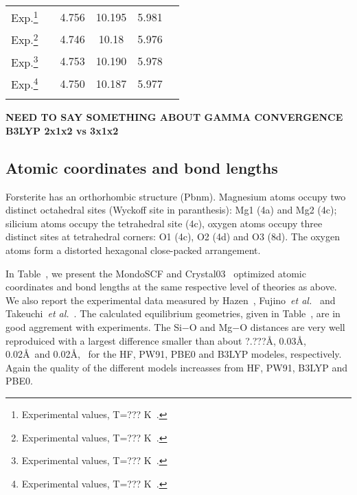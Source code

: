 \documentclass[pra,twocolumn,twocolumngrid,superbib]{revtex4} %
\begin{document}
\begin{table}[t]
\begin{tabular}{llcccc}
    {Exp.}\footnote[7]{Experimental values, T=??? K~\cite{HYoder57}.}
    &        & 4.756 & 10.195 & 5.981 & \\
    {Exp.}\footnote[8]{Experimental values, T=??? K~\cite{RHazen76}.}
    &        & 4.746 & 10.18  & 5.976 & \\
    {Exp.}\footnote[9]{Experimental values, T=??? K~\cite{KFujino81}.}
    &        & 4.753 & 10.190 & 5.978 & \\
    {Exp.}\footnote[10]{Experimental values, T=??? K~\cite{YTakeuchi84}.}
    &        & 4.750 & 10.187 & 5.977 & \\
  \botrule
  \end{tabular}
\end{table}

{\bf NEED TO SAY SOMETHING ABOUT GAMMA CONVERGENCE B3LYP 2x1x2 vs 3x1x2}\\
\subsection{Atomic coordinates and bond lengths}

Forsterite has an orthorhombic structure (Pbnm). Magnesium atoms occupy two
distinct octahedral sites (Wyckoff site in paranthesis): 
Mg1 (4a) and Mg2 (4c); silicium atoms occupy the tetrahedral site (4c),
oxygen atoms occupy three distinct sites at tetrahedral corners: 
O1 (4c), O2 (4d) and O3 (8d). The oxygen atoms form a distorted hexagonal 
close-packed arrangement.

In Table~\cite{Tab:FracCoords}, we present the {\sc MondoSCF} and {\sc Crystal03}~\cite{YNoel06} 
optimized atomic coordinates and bond lengths at the same respective level of theories as above.
We also report the experimental data measured by Hazen~\cite{RHazen76}, 
Fujino~\emph{et al.}~\cite{KFujino81} and Takeuchi~\emph{et al.}~\cite{YTakeuchi84}.
The calculated equilibrium geometries, given in Table~\cite{Tab:FracCoords}, are
in good aggrement with experiments. The Si$-$O and Mg$-$O distances are very well
reproduiced with a largest difference smaller than about ?.???\AA, 0.03\AA, 0.02\AA~and
0.02\AA, ~for the HF, PW91, PBE0 and B3LYP modeles, respectively.
Again the quality of the different models increasses from HF, PW91, B3LYP and PBE0.
\end{document}
